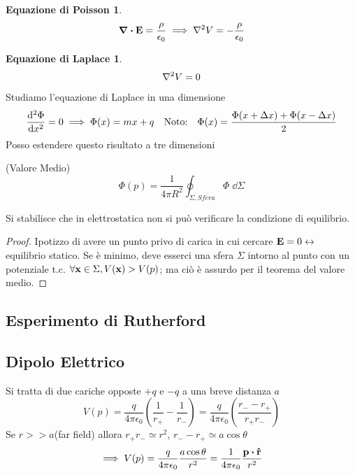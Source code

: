 \documentclass[12pt,a4paper]{article}
\begin{document}
\newtheorem*{EP}{Equazione di Poisson}
\begin{EP}
    \begin{equation*}
        \div \vb{E}= \frac{\rho}{\epsilon_0}\implies \laplacian V = -\frac{\rho}{\epsilon_0}
    \end{equation*}
\end{EP}

\newtheorem*{EL}{Equazione di Laplace}
\begin{EL}
    \begin{equation*}
        \laplacian V = 0
    \end{equation*}
\end{EL}





Studiamo l'equazione di Laplace in una dimensione
\begin{equation*}
    \dv[2]{\Phi}{x}=0 \implies\Phi(x) = mx + q \quad \text{Noto:} \quad\Phi(x) = \frac{\Phi(x+\Delta x)+\Phi(x-\Delta x)}{2}
\end{equation*}
Posso estendere questo risultato a tre dimensioni
\begin{theorem}
    (Valore Medio)
    \begin{equation*}
        \Phi(p)= \frac{1}{4\pi R^2}\oint_{\Sigma, Sfera} \Phi \;\dd{\Sigma}
    \end{equation*}
\end{theorem}

\begin{proposition}
    Si stabilisce che in elettrostatica non si può verificare la condizione di equilibrio.
\end{proposition}
\begin{proof}
    Ipotizzo di avere un punto privo di carica in cui cercare $\vb{E}=0 \leftrightarrow$ equilibrio statico.
    Se è minimo, deve esserci una sfera $\Sigma$ intorno al punto con un potenziale t.c. $\forall\vb{x}\in\Sigma, V(\vb{x})>V(p)$;
    ma ciò è assurdo per il teorema del valore medio.
\end{proof}

\subsection{Esperimento di Rutherford}

\subsection{Dipolo Elettrico}
Si tratta di due cariche opposte $+ q$ e $-q$ a una breve distanza $a$
\begin{equation*}
    V(p)= \frac{q}{4\pi\epsilon_0}\left( \frac{1}{r_+}-\frac{1}{r_-} \right)= \frac{q}{4\pi\epsilon_0}\left( \frac{r_--r_+}{r_+r_-}\right)
\end{equation*}
Se $r>>a$(far field) allora $r_+r_-\simeq r^2$, $r_--r_+\simeq a \cos \theta$
\begin{equation*}
    \implies V(p)=  \frac{q}{4\pi\epsilon_0}\frac{a \cos \theta}{r^2}= \frac{1}{4\pi\epsilon_0}\frac{\vb{p}\vdot\vu{r}}{r^2}
\end{equation*}
\end{document}
